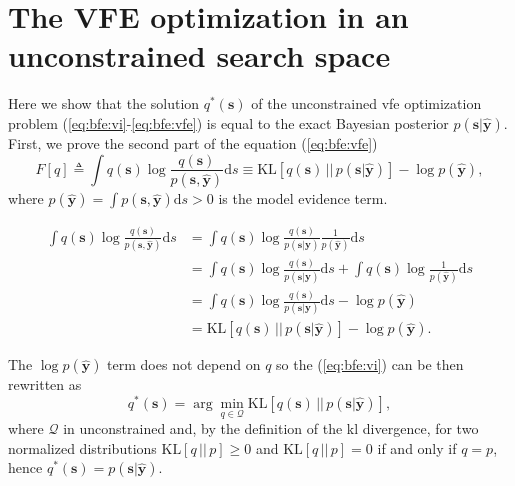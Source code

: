 \section{The VFE optimization in an unconstrained search space}\label{appendix:proofs:vi-is-exact-if-no-constraints}

Here we show that the solution $q^*(\bm{s})$ of the unconstrained \ac{vfe} optimization problem
  (\ref{eq:bfe:vi}-\ref{eq:bfe:vfe}) is equal to the exact Bayesian posterior $p(\bm{s}\vert\hat{\bm{y}})$.
First, we prove the second part of the equation (\ref{eq:bfe:vfe})
  \begin{equation}
    \label{eq:appendix:vfe-is-kl-minus-log-evidence} F[q] \triangleq \int
    q(\bm{s})\log\frac{q(\bm{s})}{p(\bm{s}, \hat{\bm{y}})}\mathrm{d}s \equiv
    \mathrm{KL}\left[q(\bm{s})\,\vert\vert\,p(\bm{s}\vert \hat{\bm{y}})\right] - \log p(\hat{\bm{y}}),
  \end{equation}
  where $p(\hat{\bm{y}}) = \int p(\bm{s}, \hat{\bm{y}})\mathrm{d}s > 0$ is the model evidence term.

\begin{equation}
  \label{eq:appendix:proofs:vi-is-exact-if-no-constraints}
  \begin{split}
    \int q(\bm{s})\log\frac{ q(\bm{s}) }{ p(\bm{s}, \hat{\bm{y}}) }
    \mathrm{d}s
    &=  \int q(\bm{s})\log\frac{ q(\bm{s}) }{ p(\bm{s}\vert \hat{\bm{y}}) }\frac{1}{p(\hat{\bm{y}})}
    \mathrm{d}s \\
    &=  \int q(\bm{s})\log\frac{q(\bm{s})}{p(\bm{s}\vert\hat{\bm{y}}) }\mathrm{d}s + \int q(\bm{s})\log\frac{1}{p(\hat{\bm{y}})}\mathrm{d}s \\
    &=  \int q(\bm{s})\log\frac{q(\bm{s})}{p(\bm{s}\vert \hat{\bm{y}}) }\mathrm{d}s - \log p(\hat{\bm{y}}) \\
    &=  \mathrm{KL}\left[q(\bm{s})\,\vert\vert\, p(\bm{s}\vert\hat{\bm{y}})\right] - \log p(\hat{\bm{y}}).
  \end{split}
\end{equation}


The $\log p(\hat{\bm{y}})$ term does not depend on $q$ so the (\ref{eq:bfe:vi}) can be then rewritten as
  \begin{equation}
q^*(\bm{s}) = \arg\min_{q \in \mathcal{Q}} \mathrm{KL}\left[q(\bm{s})\,\vert\vert\, p(\bm{s}\vert\hat{\bm{y}})\right],
  \end{equation}
  where $\mathcal{Q}$ in unconstrained and, by the definition of the \ac{kl} divergence, for two normalized distributions
  $\mathrm{KL}\left[q\,\vert\vert\, p\right] \geq 0$ and
  $\mathrm{KL}\left[q\,\vert\vert\,p\right] = 0$ if and only if $q = p$, hence $q^*(\bm{s}) = p(\bm{s}\vert\hat{\bm{y}})$. 
